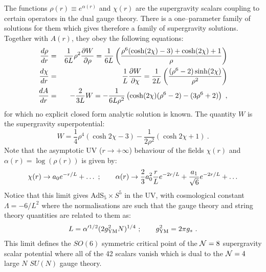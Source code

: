 \documentclass[a4paper,12pt]{article}
\newcommand{\labell}[1]{\label{#1}}
\begin{document}
  
The functions $\rho(r)\equiv e^{\alpha(r)}$ and $\chi(r)$ %
are the supergravity scalars coupling to certain operators in the dual
gauge theory.  There is a one--parameter family of solutions for them
which gives therefore a family of supergravity solutions. Together
with $A(r)$, they obey the following equations\cite{freed1}:
\begin{eqnarray}  
{d\rho\over dr}&=&{1\over 6L}\rho^2\frac{\partial W}{\partial\rho}={1\over 6L}
\left({\rho^6(\cosh(2\chi)-3)+\cosh(2\chi) + 1\over\rho}\right)  
\nonumber \\  
{d\chi\over dr}&=&{1\over L}\frac{\partial W}{\partial\chi}={1\over 2L}
\left({(\rho^6-2)\sinh(2\chi)\over \rho^2}\right)\nonumber \\  
{dA\over dr}&=&-{2\over 3L} W=-{1\over 6L \rho^2}\left(\cosh(2\chi)(\rho^6-2)
-(3\rho^6+2)\right)\ ,
\labell{flows}  
\end{eqnarray}  
for which no explicit closed form analytic solution is known.
The quantity $W$ is the supergravity superpotential:
\begin{equation}
W=\frac{1}{4}\rho^4(\cosh 2\chi -3) -\frac{1}{2\rho^2}(\cosh 2\chi+1)\ .
\labell{superpotential}
\end{equation}
Note that the asymptotic UV ($r\to+\infty$) behaviour of the fields
$\chi(r)$ and $\alpha(r)=\log(\rho(r))$ is given by\cite{freed1}:
\begin{equation}
\chi(r)\to a_0e^{-r/L}+\ldots\ ;
\qquad \alpha(r)\to {2\over3}a_0^2 {r\over L} e^{-2r/L}+{a_1\over\sqrt{6}}e^{-2r/L}
+\ldots
\labell{asymptone}
\end{equation} 
Notice that this limit gives AdS$_5\times S^5$ in the UV, with
cosmological constant $\Lambda=-6/L^2$ where the normalisations are
such that the gauge theory and string theory quantities are related to
them as:
\begin{eqnarray}
L=\alpha^{\prime1/2} (2g^2_{\rm
  YM}N)^{1/4}\ ;\qquad g^2_{\rm YM}=2\pi g_s\ .
\labell{relations}
\end{eqnarray}
This limit defines the $SO(6)$ symmetric critical point of the ${\cal
  N}=8$ supergravity scalar potential where all of the 42 scalars
vanish which is dual to the ${\cal N}=4$ large $N$ $SU(N)$ gauge
theory.
\end{document}
